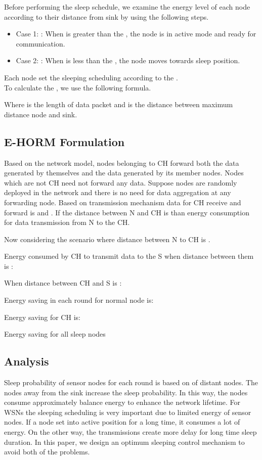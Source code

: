 \documentclass{article}
\begin{document}
Before performing the sleep schedule, we examine the energy level of each node according to their distance from sink by using the following steps.
\begin{itemize}
  \item Case 1: : When  is greater than the , the node is in active mode and ready for communication.
  \item Case 2: : When  is less than the , the node moves towards sleep position.
\end{itemize}
Each node set the sleeping scheduling according to the .\\
To calculate the , we use the following formula.

Where  is the length of data packet and  is the distance between maximum distance node and sink.
\subsection{E-HORM Formulation}
Based on the network model, nodes belonging to CH forward both the data generated by themselves and the data generated by its member nodes. Nodes which are not CH need not forward any data. Suppose nodes are randomly deployed in the network and there is no need for data aggregation at any forwarding node. Based on transmission mechanism data for CH receive and forward is  and .
If the distance between N and CH is  than energy consumption for data transmission from N to the CH.

Now considering the scenario where distance between N to CH is .

Energy consumed by CH to transmit data to the S when distance between them is :

When distance between CH and S is :



Energy saving in each round for normal node is:

Energy saving for CH is:

Energy saving for all sleep nodes

\subsection{Analysis}
Sleep probability of sensor nodes for each round is based on  of distant nodes. The nodes away from the sink increase the sleep probability. In this way, the nodes consume approximately balance energy to enhance the network lifetime.
For WSNs the sleeping scheduling is very important due to limited energy of sensor nodes. If a node set into active position for a long time, it consumes a lot of energy. On the other way, the transmissions create more delay for long time sleep duration. In this paper, we design an optimum sleeping control mechanism to avoid both of the problems.
\end{document}
